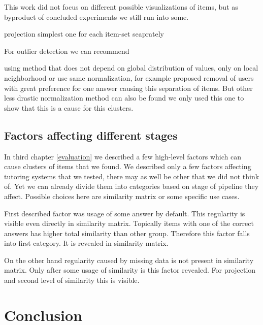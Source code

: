 \documentclass[
  digital, %
  table,   %
  nolof,     %
  nolot,     %
  nocover,
  color,
  final, %
]{fithesis3}
\begin{document}

This work did not focus on different possible visualizations of items, but as byproduct of concluded experiments we still run into some.

projection
simplest one
for each item-set seaprately


For outlier detection we can recommend

using method that does not depend on global distribution of values, only on local neighborhood
or
use same normalization, for example proposed removal of users with great preference for one answer causing this separation of items. But other less drastic normalization method can also be found we only used this one to show that this is a cause for this clusters.


\section{Factors affecting different stages}\label{factors-affecting-different-stages}

In third chapter \ref{evaluation} we described a few high-level factors which can cause clusters of items that we found. We described only a few factors affecting tutoring systems that we tested, there may as well be other that we did not think of. Yet we can already divide them into categories based on stage of pipeline they affect. Possible choices here are similarity matrix or some specific use cases.

First described factor was usage of some answer by default. This regularity is visible even directly in similarity matrix. Topically items with one of the correct answers has higher total similarity than other group. Therefore this factor falls into first category. It is revealed in similarity matrix.

On the other hand regularity caused by missing data is not present in similarity matrix. Only after some usage of similarity is this factor revealed. For projection and second level of similarity this is visible.

\chapter{Conclusion}

\end{document}
